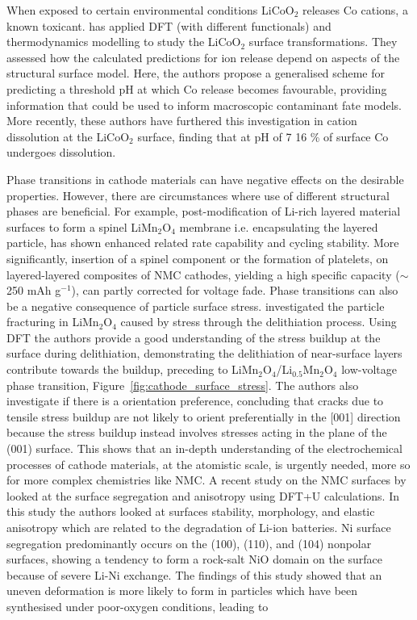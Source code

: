 \documentclass[../main.tex]{subfiles}
\begin{document}
When exposed to certain environmental conditions LiCoO$_2$ releases Co cations, a known toxicant. \citeauthor{abbaspour2020dft} has applied DFT (with different functionals) and thermodynamics modelling to study the LiCoO$_2$ surface transformations. \cite{abbaspour2020dft} They assessed how the calculated predictions for ion release depend on aspects of the structural surface model. Here, the authors propose a generalised scheme for predicting a threshold pH at which Co release becomes favourable, providing information that could be used to inform macroscopic contaminant fate models. More recently, these authors have furthered this investigation in cation dissolution at the LiCoO$_2$ surface, finding that at pH of 7 16 \% of surface Co undergoes dissolution. \cite{abbaspour2020dft}

Phase transitions in cathode materials can have negative effects on the desirable properties. However, there are circumstances where use of different structural phases are beneficial. For example, post-modification of Li-rich layered material surfaces to form a spinel LiMn$_2$O$_4$ membrane i.e. encapsulating the layered particle, has shown enhanced related rate capability and cycling stability.\cite{Ledwaba2020,deng2017layered,deng2016layered} More significantly, insertion of a spinel component\cite{long2014advances} or the formation of platelets,\cite{wang2013nanoarchitecture} on layered-layered composites of NMC cathodes, yielding a high specific capacity ($\sim$250 mAh g$^{-1}$), can partly corrected for voltage fade.\cite{Ledwaba2020} Phase transitions can also be a negative consequence of particle surface stress. \citeauthor{warburton2020oriented} investigated the particle fracturing in LiMn$_2$O$_4$ caused by stress through the delithiation process. \cite{warburton2020oriented} Using DFT the authors provide a good understanding of the stress buildup at the surface during delithiation, demonstrating the delithiation of near-surface layers contribute towards the buildup, preceding to LiMn$_2$O$_4$/Li$_{0.5}$Mn$_2$O$_4$ low-voltage phase transition, Figure~\ref{fig:cathode_surface_stress}. The authors also investigate if there is a orientation preference, concluding that cracks due to tensile stress buildup are not likely to orient preferentially in the [001] direction because the stress buildup instead involves stresses acting in the plane of the (001) surface. \cite{warburton2020oriented} This shows that an in-depth understanding of the electrochemical processes of cathode materials, at the atomistic scale, is urgently needed, more so for more complex chemistries like NMC. A recent study on the NMC surfaces by \citeauthor{liang2018ab} looked at the surface segregation and anisotropy using DFT+U calculations. \cite{liang2018ab} In this study the authors looked at surfaces stability, morphology, and elastic anisotropy which are related to the degradation of Li-ion batteries. Ni surface segregation predominantly occurs on the (100), (110), and (104) nonpolar surfaces, showing a tendency to form a rock-salt NiO domain on the surface because of severe Li-Ni exchange. The findings of this study showed that an uneven deformation is more likely to form in particles which have been synthesised under poor-oxygen conditions, leading to 
\end{document}
